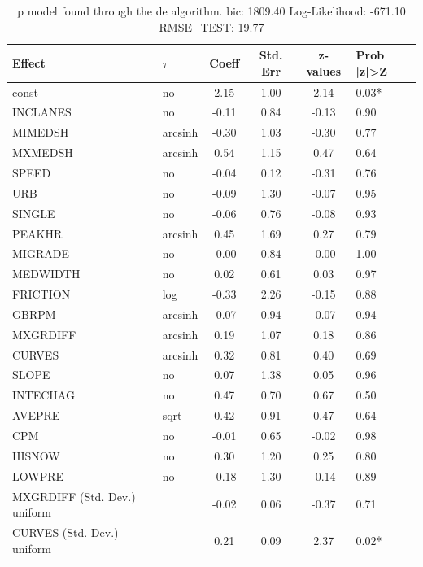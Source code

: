 \begin{table}
	\caption{p model found through the de algorithm. bic: 1809.40 Log-Likelihood: -671.10 RMSE_TEST: 19.77}
	\begin{center}
		\begin{tabular}{|l|l|c|c|c|l|}
			\hline
			Effect & $\tau$ & Coeff & Std. Err & z-values & Prob |z|>Z \\
			\hline
			const & no & 2.15 & 1.00 & 2.14 & 0.03* \\
			\hline
			INCLANES & no & -0.11 & 0.84 & -0.13 & 0.90 \\
			\hline
			MIMEDSH & arcsinh & -0.30 & 1.03 & -0.30 & 0.77 \\
			\hline
			MXMEDSH & arcsinh & 0.54 & 1.15 & 0.47 & 0.64 \\
			\hline
			SPEED & no & -0.04 & 0.12 & -0.31 & 0.76 \\
			\hline
			URB & no & -0.09 & 1.30 & -0.07 & 0.95 \\
			\hline
			SINGLE & no & -0.06 & 0.76 & -0.08 & 0.93 \\
			\hline
			PEAKHR & arcsinh & 0.45 & 1.69 & 0.27 & 0.79 \\
			\hline
			MIGRADE & no & -0.00 & 0.84 & -0.00 & 1.00 \\
			\hline
			MEDWIDTH & no & 0.02 & 0.61 & 0.03 & 0.97 \\
			\hline
			FRICTION & log & -0.33 & 2.26 & -0.15 & 0.88 \\
			\hline
			GBRPM & arcsinh & -0.07 & 0.94 & -0.07 & 0.94 \\
			\hline
			MXGRDIFF & arcsinh & 0.19 & 1.07 & 0.18 & 0.86 \\
			\hline
			CURVES & arcsinh & 0.32 & 0.81 & 0.40 & 0.69 \\
			\hline
			SLOPE & no & 0.07 & 1.38 & 0.05 & 0.96 \\
			\hline
			INTECHAG & no & 0.47 & 0.70 & 0.67 & 0.50 \\
			\hline
			AVEPRE & sqrt & 0.42 & 0.91 & 0.47 & 0.64 \\
			\hline
			CPM & no & -0.01 & 0.65 & -0.02 & 0.98 \\
			\hline
			HISNOW & no & 0.30 & 1.20 & 0.25 & 0.80 \\
			\hline
			LOWPRE & no & -0.18 & 1.30 & -0.14 & 0.89 \\
			\hline
			MXGRDIFF (Std. Dev.) uniform &  & -0.02 & 0.06 & -0.37 & 0.71 \\
			\hline
			CURVES (Std. Dev.) uniform &  & 0.21 & 0.09 & 2.37 & 0.02* \\

\end{tabular}
\end{center}
\end{table}
